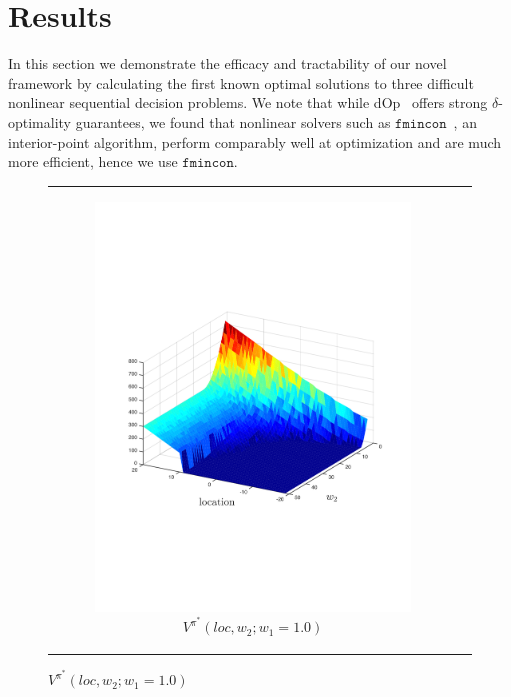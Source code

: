 \section{Results}
\label{sec:results}

In this section we demonstrate the efficacy and tractability of our novel framework by calculating the first known optimal solutions to three difficult nonlinear sequential decision problems. We note that while dOp~\cite{Gao2013} offers strong {\footnotesize $ \delta $}-optimality guarantees, we found that nonlinear solvers such as $ \mathtt{fmincon} $~\cite{MATLAB_2010}, an interior-point algorithm, perform comparably well at optimization and are much more efficient, hence we use $ \mathtt{fmincon} $.

{\centering
    \begin{figure}[ht]
        \begin{tabular}{cc}
            \begin{subfigure}{0.24\textwidth}\centering\includegraphics[width=\textwidth]{images/robot_vf_new}\caption{{\footnotesize $V^{\pi^{*}}(loc, w_2; w_1 = 1.0)$} }\label{fig:navigation_vf}\end{subfigure}&

\end{tabular}
\end{figure}}
